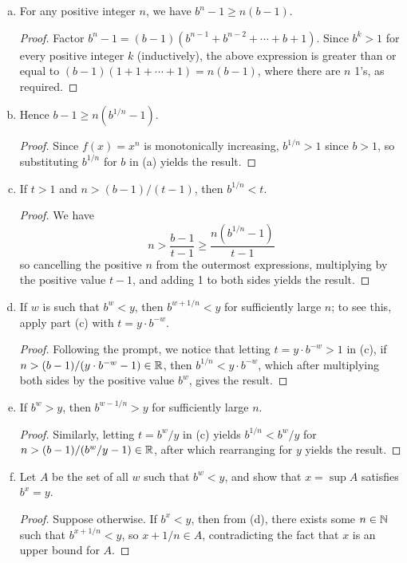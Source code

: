 \begin{enumerate}
\begin{enumerate}[(a)]
\item For any positive integer $n$, we have $b^n - 1 \ge n(b - 1)$. 
\begin{proof}
Factor $b^n - 1 = (b - 1)(b^{n - 1} + b^{n - 2} + \dotsb + b + 1)$. Since $b^k > 1$ for every positive integer $k$ (inductively), the above expression is greater than or equal to $(b - 1)(1 + 1 + \dotsb + 1) = n(b - 1)$, where there are $n$ 1's, as required.
\end{proof}

\item Hence $b - 1 \ge n(b^{1/n} - 1)$.
\begin{proof}
Since $f(x) = x^n$ is monotonically increasing, $b^{1/n} > 1$ since $b > 1$, so substituting $b^{1/n}$ for $b$ in (a) yields the result.
\end{proof}

\item If $t > 1$ and $n > (b - 1)/(t - 1)$, then $b^{1/n} < t$.
\begin{proof}
We have 
\[
	n > \frac{b - 1}{t - 1} \ge \frac{n(b^{1/n} - 1)}{t - 1}
\]
so cancelling the positive $n$ from the outermost expressions, multiplying by the positive value $t - 1$, and adding 1 to both sides yields the result.
\end{proof}

\item If $w$ is such that $b^w < y$, then $b^{w + 1/n} < y$ for sufficiently large $n$; to see this, apply part (c) with $t = y \cdot b^{-w}$.
\begin{proof}
Following the prompt, we notice that letting $t = y \cdot b^{-w} > 1$ in (c), if $n > (b - 1)/(y \cdot b^{-w} - 1) \in \mathbb{R}$, then $b^{1/n} < y \cdot b^{-w}$, which after multiplying both sides by the positive value $b^w$, gives the result.
\end{proof}

\item If $b^w > y$, then $b^{w - 1/n} > y$ for sufficiently large $n$.
\begin{proof}
Similarly, letting $t = b^w / y$ in (c) yields $b^{1/n} < b^w / y$ for $n > (b - 1)/(b^w / y - 1) \in \mathbb{R}$, after which rearranging for $y$ yields the result. 
\end{proof}

\item Let $A$ be the set of all $w$ such that $b^w < y$, and show that $x = \sup A$ satisfies $b^x = y$.
\begin{proof}
Suppose otherwise. If $b^x < y$, then from (d), there exists some $n \in \mathbb{N}$ such that $b^{x + 1/n} < y$, so $x + 1/n \in A$, contradicting the fact that $x$ is an upper bound for $A$. 


\end{proof}
\end{enumerate}
\end{enumerate}

